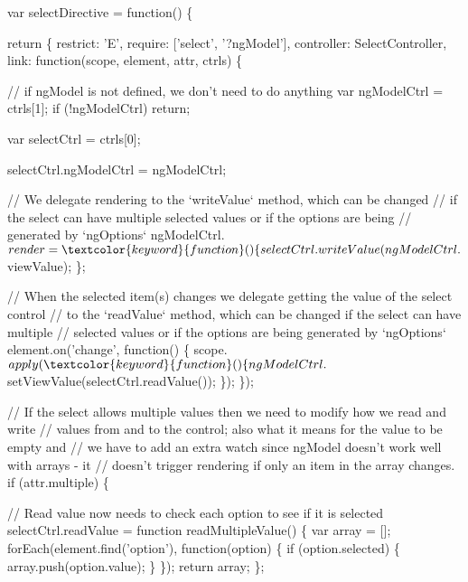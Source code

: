 \begin{DoxyCodeInclude}
{{{{var selectDirective = \textcolor{keyword}{function}() \{

  \textcolor{keywordflow}{return} \{
    restrict: \textcolor{charliteral}{'E'},
    require: [\textcolor{stringliteral}{'select'}, \textcolor{stringliteral}{'?ngModel'}],
    controller: SelectController,
    link: \textcolor{keyword}{function}(scope, element, attr, ctrls) \{

      \textcolor{comment}{// if ngModel is not defined, we don't need to do anything}
      var ngModelCtrl = ctrls[1];
      \textcolor{keywordflow}{if} (!ngModelCtrl) \textcolor{keywordflow}{return};

      var selectCtrl = ctrls[0];

      selectCtrl.ngModelCtrl = ngModelCtrl;

      \textcolor{comment}{// We delegate rendering to the `writeValue` method, which can be changed}
      \textcolor{comment}{// if the select can have multiple selected values or if the options are being}
      \textcolor{comment}{// generated by `ngOptions`}
      ngModelCtrl.$render = \textcolor{keyword}{function}() \{
        selectCtrl.writeValue(ngModelCtrl.$viewValue);
      \};

      \textcolor{comment}{// When the selected item(s) changes we delegate getting the value of the select control}
      \textcolor{comment}{// to the `readValue` method, which can be changed if the select can have multiple}
      \textcolor{comment}{// selected values or if the options are being generated by `ngOptions`}
      element.on(\textcolor{stringliteral}{'change'}, \textcolor{keyword}{function}() \{
        scope.$apply(\textcolor{keyword}{function}() \{
          ngModelCtrl.$setViewValue(selectCtrl.readValue());
        \});
      \});

      \textcolor{comment}{// If the select allows multiple values then we need to modify how we read and write}
      \textcolor{comment}{// values from and to the control; also what it means for the value to be empty and}
      \textcolor{comment}{// we have to add an extra watch since ngModel doesn't work well with arrays - it}
      \textcolor{comment}{// doesn't trigger rendering if only an item in the array changes.}
      \textcolor{keywordflow}{if} (attr.multiple) \{

        \textcolor{comment}{// Read value now needs to check each option to see if it is selected}
        selectCtrl.readValue = \textcolor{keyword}{function} readMultipleValue() \{
          var array = [];
          forEach(element.find(\textcolor{stringliteral}{'option'}), \textcolor{keyword}{function}(option) \{
            \textcolor{keywordflow}{if} (option.selected) \{
              array.push(option.value);
            \}
          \});
          \textcolor{keywordflow}{return} array;
        \};

}}}}
\end{DoxyCodeInclude}

